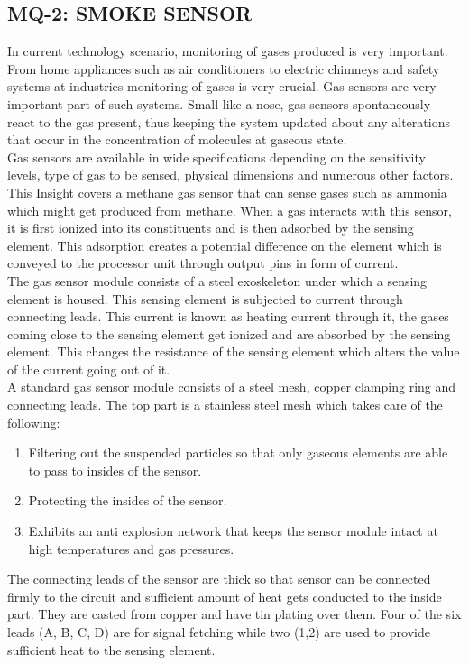 \subsection{MQ-2: SMOKE SENSOR}
In current technology scenario, monitoring of gases produced is very important. From home appliances such as air conditioners to electric chimneys and safety systems at industries monitoring of gases is very crucial. Gas sensors are very important part of such systems.  Small like a nose, gas sensors spontaneously react to the gas present, thus keeping the system updated about any alterations that occur in the concentration of molecules at gaseous state.\\
Gas sensors are available in wide specifications depending on the sensitivity levels, type of gas to be sensed, physical dimensions and numerous other factors. This Insight covers a methane gas sensor that can sense gases such as ammonia which might get produced from methane. When a gas interacts with this sensor, it is first ionized into its constituents and is then adsorbed by the sensing element. This adsorption creates a potential difference on the element which is conveyed to the processor unit through output pins in form of current. \\
The gas sensor module consists of a steel exoskeleton under which a sensing element is housed. This sensing element is subjected to current through connecting leads. This current is known as heating current through it, the gases coming close to the sensing element get ionized and are absorbed by the sensing element. This changes the resistance of the sensing element which alters the value of the current going out of it.\\
A standard gas sensor module consists of a steel mesh, copper clamping ring and connecting leads. The top part is a stainless steel mesh which takes care of the following:
\begin{enumerate}
\item Filtering out the suspended particles so that only gaseous elements are able to pass to insides of the sensor.  
\item Protecting the insides of the sensor.
\item Exhibits an anti explosion network that keeps the sensor module intact at high temperatures and gas pressures.
\end{enumerate}
\justify The connecting leads of the sensor are thick so that sensor can be connected firmly to the circuit and sufficient amount of heat gets conducted to the inside part. They are casted from copper and have tin plating over them. Four of the six leads (A, B, C, D) are for signal fetching while two (1,2) are used to provide sufficient heat to the sensing element.
